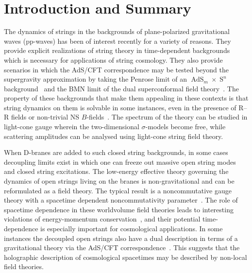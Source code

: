 \documentclass[11pt,a4paper]{article}
\DeclareMathOperator{\AdS}{AdS}
\DeclareMathOperator{\Sphere}{S}
\let\S\Sphere
\renewcommand{\thefootnote}{\fnsymbol{footnote}}
\newcommand{\newsection}{\setcounter{equation}{0}\section}
\begin{document}
\newpage

\tableofcontents

\newpage

\renewcommand{\thefootnote}{\arabic{footnote}} \setcounter{footnote}{0}

\newsection{Introduction and Summary\label{Intro}}

The dynamics of strings in the backgrounds of plane-polarized
gravitational waves (pp-waves) has been of interest recently for a
variety of reasons. They provide explicit realizations of string
theory in time-dependent backgrounds which is necessary for
applications of string cosmology. They also provide scenarios in
which the AdS/CFT correspondence may be tested beyond the supergravity
approximation by taking the Penrose limit of an $\AdS_m\times\S^n$
background~\cite{BFP1} and the BMN limit of the dual superconformal
field theory~\cite{BMN1}. The property of these backgrounds that make them
appealing in these contexts is that string dynamics on them is
solvable in some instances, even in the presence of R--R fields or
non-trivial NS $B$-fields~\cite{BMN1,BOLPT1,Met1,PRT1,RT1}. The
spectrum of the theory can be studied in light-cone gauge wherein the
two-dimensional $\sigma$-models become free, while scattering
amplitudes can be analysed using light-cone string field theory.

When D-branes are added to such closed string backgrounds, in some cases
decoupling limits exist in which one can freeze out massive open
string modes and closed string excitations. The low-energy effective
theory governing the dynamics of open strings living on the branes is
non-gravitational and can be reformulated as a field theory. The
typical result is a noncommutative gauge theory with a spacetime dependent
noncommutativity parameter~\cite{CLO1,DRRS1,DN1,HS1,HT1,LNR1}. The role of
spacetime dependence in these worldvolume field theories leads to
interesting violations of energy-momentum conservation~\cite{BG1,RS1},
and their potential time-dependence is especially important for
cosmological applications. In some instances the decoupled open
strings also have a dual description in terms of a gravitational
theory via the AdS/CFT correspondence~\cite{HS1}. This suggests
that the holographic description of cosmological spacetimes may be
described by non-local field theories.
\end{document}
